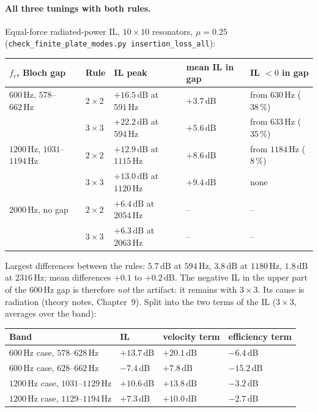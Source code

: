 \documentclass[11pt]{article}
\begin{document}
\paragraph{All three tunings with both rules.} Equal-force radiated-power IL, $10 \times 10$
resonators, $\mu = 0.25$ (\texttt{check\_finite\_plate\_modes.py insertion\_loss\_all}):
\begin{center}
\begin{tabular}{|l|l|l|l|l|}
\hline
$f_r$, Bloch gap & Rule & IL peak & mean IL in gap & IL $< 0$ in gap \\
\hline
$600\,\mathrm{Hz}$, $578$--$662\,\mathrm{Hz}$ & $2\times 2$ & $+16.5\,\mathrm{dB}$ at $591\,\mathrm{Hz}$ & $+3.7\,\mathrm{dB}$ & from $630\,\mathrm{Hz}$ ($38\,\%$) \\
 & $3\times 3$ & $+22.2\,\mathrm{dB}$ at $594\,\mathrm{Hz}$ & $+5.6\,\mathrm{dB}$ & from $633\,\mathrm{Hz}$ ($35\,\%$) \\
$1200\,\mathrm{Hz}$, $1031$--$1194\,\mathrm{Hz}$ & $2\times 2$ & $+12.9\,\mathrm{dB}$ at $1115\,\mathrm{Hz}$ & $+8.6\,\mathrm{dB}$ & from $1184\,\mathrm{Hz}$ ($8\,\%$) \\
 & $3\times 3$ & $+13.0\,\mathrm{dB}$ at $1120\,\mathrm{Hz}$ & $+9.4\,\mathrm{dB}$ & none \\
$2000\,\mathrm{Hz}$, no gap & $2\times 2$ & $+6.4\,\mathrm{dB}$ at $2054\,\mathrm{Hz}$ & -- & -- \\
 & $3\times 3$ & $+6.3\,\mathrm{dB}$ at $2063\,\mathrm{Hz}$ & -- & -- \\
\hline
\end{tabular}
\end{center}
Largest differences between the rules: $5.7\,\mathrm{dB}$ at $594\,\mathrm{Hz}$,
$3.8\,\mathrm{dB}$ at $1180\,\mathrm{Hz}$, $1.8\,\mathrm{dB}$ at $2316\,\mathrm{Hz}$; mean
differences $+0.1$ to $+0.2\,\mathrm{dB}$. The negative IL in the upper part of the
$600\,\mathrm{Hz}$ gap is therefore \emph{not} the artifact: it remains with $3\times 3$.
Its cause is radiation (theory notes, Chapter~9). Split into the two terms of the IL
($3\times 3$, averages over the band):
\begin{center}
\begin{tabular}{|l|l|l|l|}
\hline
Band & IL & velocity term & efficiency term \\
\hline
$600\,\mathrm{Hz}$ case, $578$--$628\,\mathrm{Hz}$ & $+13.7\,\mathrm{dB}$ & $+20.1\,\mathrm{dB}$ & $-6.4\,\mathrm{dB}$ \\
$600\,\mathrm{Hz}$ case, $628$--$662\,\mathrm{Hz}$ & $-7.4\,\mathrm{dB}$ & $+7.8\,\mathrm{dB}$ & $-15.2\,\mathrm{dB}$ \\
$1200\,\mathrm{Hz}$ case, $1031$--$1129\,\mathrm{Hz}$ & $+10.6\,\mathrm{dB}$ & $+13.8\,\mathrm{dB}$ & $-3.2\,\mathrm{dB}$ \\
$1200\,\mathrm{Hz}$ case, $1129$--$1194\,\mathrm{Hz}$ & $+7.3\,\mathrm{dB}$ & $+10.0\,\mathrm{dB}$ & $-2.7\,\mathrm{dB}$ \\
\hline
\end{tabular}
\end{center}
\end{document}
